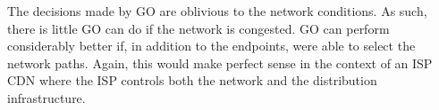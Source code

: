  The decisions made by GO are
oblivious to the network conditions. As such, there is little GO can
do if the network is congested. GO can perform considerably better if,
in addition to the endpoints, were able to select the network
paths. Again, this would make perfect sense in the context of an ISP
CDN where the ISP controls both the network and the distribution
infrastructure.





